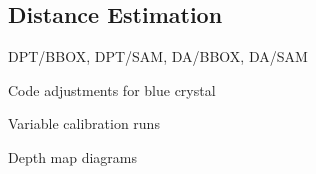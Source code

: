 \subsection{Distance Estimation}

DPT/BBOX, DPT/SAM, DA/BBOX, DA/SAM

Code adjustments for blue crystal

Variable calibration runs

Depth map diagrams